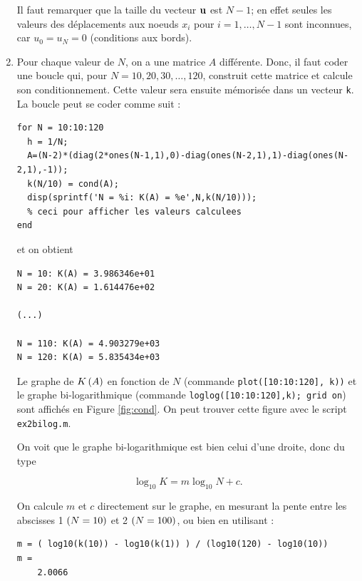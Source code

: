 \begin{enumerate}[label=\alph*)]
        Il faut remarquer que la taille du vecteur $\mathbf{u}$ est $N - 1$; en effet seules les valeurs des déplacements aux noeuds $x_{i}$ pour $i = 1, \dots, N - 1$ sont inconnues, car $u_{0} = u_{N} = 0$ (conditions aux bords).
        
  
  \item Pour chaque valeur de $N$, on a une matrice $A$ différente.
        Donc, il faut coder une boucle qui, pour $N = 10, 20, 30, \dots, 120$, construit cette matrice et calcule son conditionnement.
        Cette valeur sera ensuite mémorisée dans un vecteur \texttt{k}.
        La boucle peut se coder comme suit : 
        
\begin{verbatim}
for N = 10:10:120
  h = 1/N;
  A=(N-2)*(diag(2*ones(N-1,1),0)-diag(ones(N-2,1),1)-diag(ones(N-2,1),-1));
  k(N/10) = cond(A);
  disp(sprintf('N = %i: K(A) = %e',N,k(N/10)));
  % ceci pour afficher les valeurs calculees
end
\end{verbatim}        
        
        et on obtient
 
\begin{verbatim}
N = 10: K(A) = 3.986346e+01
N = 20: K(A) = 1.614476e+02

(...)

N = 110: K(A) = 4.903279e+03
N = 120: K(A) = 5.835434e+03
\end{verbatim} 

    Le graphe de $K \left(A\right)$ en fonction de $N$ (commande \texttt{plot([10:10:120], k))} et le graphe bi-logarithmique (commande \texttt{loglog([10:10:120],k); grid on}) sont affichés en Figure \ref{fig:cond}.
    On peut trouver cette figure avec le script \texttt{ex2bilog.m}.
    
    
    
    On voit que le graphe bi-logarithmique est bien celui d'une droite, donc du type
    
    \begin{equation*}
      \log_{10} K = m \log_{10} N + c.
    \end{equation*}
    
    On calcule $m$ et $c$ directement sur le graphe, en mesurant la pente entre les abscisses 1 $\left(N = 10\right)$ et 2 $\left(N = 100\right)$, ou bien en utilisant \MAT :
    
\begin{verbatim}
m = ( log10(k(10)) - log10(k(1)) ) / (log10(120) - log10(10))
m =
    2.0066
    

\end{verbatim}
\end{enumerate}
